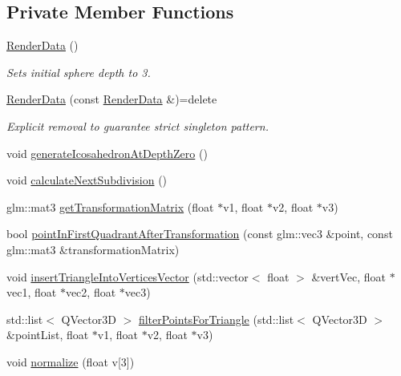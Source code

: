 \subsection*{Private Member Functions}
\begin{DoxyCompactItemize}
\item 
\hyperlink{class_render_data_a16b04b2437ea3fa034381a138cbf2f83}{Render\+Data} ()
\begin{DoxyCompactList}\small\item\em Sets initial sphere depth to 3. \end{DoxyCompactList}\item 
\hyperlink{class_render_data_ab5f9324f666abc4b85fd2c6ed868c6be}{Render\+Data} (const \hyperlink{class_render_data}{Render\+Data} \&)=delete
\begin{DoxyCompactList}\small\item\em Explicit removal to guarantee strict singleton pattern. \end{DoxyCompactList}\item 
void \hyperlink{class_render_data_adee024bdbedaae2cfd38bb2038b4aa48}{generate\+Icosahedron\+At\+Depth\+Zero} ()
\item 
void \hyperlink{class_render_data_ac1bbf9770f040e452f676358ee699767}{calculate\+Next\+Subdivision} ()
\item 
glm\+::mat3 \hyperlink{class_render_data_afbc604f853739d0198c9da5097987fa7}{get\+Transformation\+Matrix} (float $\ast$v1, float $\ast$v2, float $\ast$v3)
\item 
bool \hyperlink{class_render_data_a7b32e615d46ac5ffbd3d14de0da2c406}{point\+In\+First\+Quadrant\+After\+Transformation} (const glm\+::vec3 \&point, const glm\+::mat3 \&transformation\+Matrix)
\item 
void \hyperlink{class_render_data_a4fca77ce81a628de0ddaeb7d75a4c371}{insert\+Triangle\+Into\+Vertices\+Vector} (std\+::vector$<$ float $>$ \&vert\+Vec, float $\ast$vec1, float $\ast$vec2, float $\ast$vec3)
\item 
std\+::list$<$ Q\+Vector3D $>$ \hyperlink{class_render_data_af74f8858b9e0dedb914f24390e140a04}{filter\+Points\+For\+Triangle} (std\+::list$<$ Q\+Vector3D $>$ \&point\+List, float $\ast$v1, float $\ast$v2, float $\ast$v3)
\item 
void \hyperlink{class_render_data_ad8c590fd11eda06875112a74d318267f}{normalize} (float v\mbox{[}3\mbox{]})
\end{DoxyCompactItemize}

